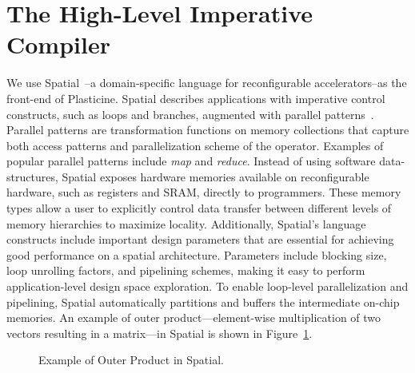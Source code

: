 \section{The High-Level Imperative Compiler} 

We use Spatial~\cite{spatial_koeplinger}--a domain-specific language for reconfigurable
accelerators--as the front-end of Plasticine.
Spatial describes applications with imperative control constructs, such as loops and branches,
augmented with parallel patterns~\cite{parallelpattern}.
Parallel patterns are transformation functions on memory collections that capture both access
patterns and parallelization scheme of the operator.
Examples of popular parallel patterns include \emph{map} and \emph{reduce}.
Instead of using software data-structures, Spatial exposes hardware memories available on reconfigurable
hardware, such as registers and SRAM, directly to programmers.
These memory types allow a user to explicitly control data transfer between different levels of
memory hierarchies to maximize locality.
Additionally, Spatial's language constructs include important design parameters 
that are essential for achieving good performance on a spatial architecture.
Parameters include blocking size, loop unrolling factors, and pipelining schemes, making it
easy to perform application-level design space exploration.
To enable loop-level parallelization and pipelining, Spatial automatically partitions and buffers 
the intermediate on-chip memories.
An example of outer product---element-wise multiplication of two vectors resulting in a matrix---in Spatial is shown in Figure~\ref{fig:spatial_app}.

\begin{figure}
\centering
  \begin{minipage}{0.6\textwidth}

  \end{minipage}
  \caption{Example of Outer Product in Spatial.}
\label{fig:spatial_app}
\end{figure}

